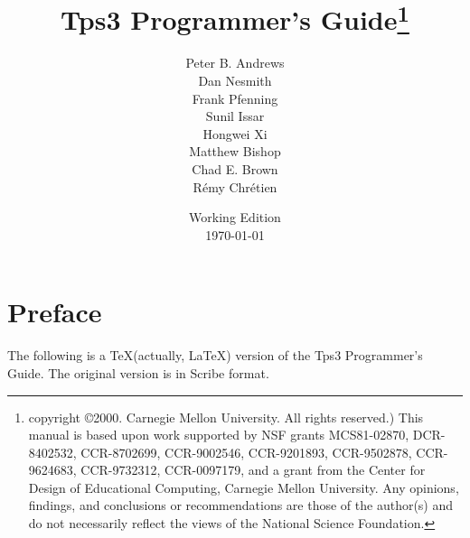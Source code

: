 \documentclass[11pt]{amsbook}
\numberwithin{figure}{chapter} %
\def\TPS{{\sc Tps3 }}
\begin{document}


\frontmatter
\title{\TPS Programmer's Guide\thanks{
copyright \copyright 2000. Carnegie Mellon University.  All rights reserved.)
This manual is based upon work supported by
NSF grants MCS81-02870, DCR-8402532, CCR-8702699, 
CCR-9002546, CCR-9201893, CCR-9502878, CCR-9624683, CCR-9732312, CCR-0097179,
and a grant from the Center for Design of Educational Computing,
Carnegie Mellon University. Any opinions, findings, and conclusions or
recommendations are those of the author(s) and do not necessarily reflect
the views of the National Science Foundation.}
}
\author{Peter B. Andrews \\
Dan Nesmith \\
Frank Pfenning \\
Sunil Issar \\
Hongwei Xi \\
Matthew Bishop \\
Chad E. Brown \\
R\'{e}my Chr\'{e}tien
}
\date{Working Edition \\
\today}

\maketitle

\setcounter{tocdepth}{5}
\tableofcontents
\newpage

%
\chapter*{Preface}
\pagestyle{plain}
The following is a \TeX (actually, \LaTeX) version of the \TPS Programmer's Guide.
The original version is in Scribe format.
\mainmatter\pagestyle{headings}
 

























\backmatter

\printindex
\end{document}
